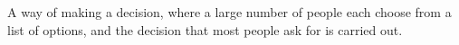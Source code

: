 A way of making a decision, where a large number of people
each choose from a list of options, and the decision that
most people ask for is carried out.